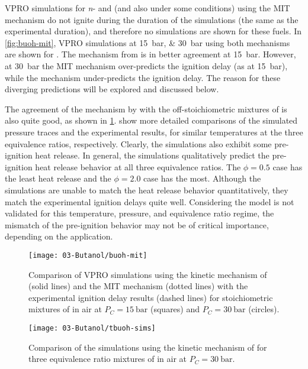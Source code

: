 \documentclass[../main.tex]{subfiles}
\begin{document}
VPRO simulations for \textit{n}- and \sBuOH{} (and also \tBuOH{} under
some conditions) using the MIT mechanism
\cite{Hansen2013,Merchant2013} do not ignite during the duration of the
simulations (the same as the experimental duration), and therefore no
simulations are shown for these fuels. In \cref{fig:buoh-mit}, VPRO
simulations at \SIlist{15;30}{\bar} using both mechanisms are shown for
\iBuOH{}. The mechanism from \textcite{Sarathy2012}
is in better agreement at \SI{15}{\bar}. However, at \SI{30}{\bar} the MIT mechanism
\cite{Hansen2013,Merchant2013} over-predicts the ignition delay (as at \SI{15}{\bar}),
while the \textcite{Sarathy2012} mechanism under-predicts the ignition delay.
The reason for these diverging predictions will be explored and discussed below.

The agreement of the mechanism by \textcite{Sarathy2012} with the
off-stoichiometric mixtures of \tBuOH{} is also quite good, as shown
in \cref{fig:tbuoh-sims}.  show more detailed comparisons
of the simulated pressure traces and the experimental results, for similar
temperatures at the three equivalence ratios, respectively. Clearly, the
simulations also exhibit some pre-ignition heat release. In general, the
simulations qualitatively predict the pre-ignition heat release behavior at all
three equivalence ratios. The $\phi=\num{0.5}$ case has the least heat release and
the $\phi=\num{2.0}$ case has the most. Although the simulations are unable to match
the heat release behavior quantitatively, they match the experimental ignition
delays quite well. Considering the model is not validated for this temperature,
pressure, and equivalence ratio regime, the mismatch of the pre-ignition
behavior may not be of critical importance, depending on the application.

\begin{figure}
    \begin{floatrow}
        \ffigbox
            {\texttt{[image: 03-Butanol/buoh-mit]}}
            {\caption{Comparison of VPRO simulations using the kinetic mechanism of
                \textcite{Sarathy2012} (solid lines) and the MIT mechanism
                \cite{Hansen2013,Merchant2013} (dotted lines) with the experimental
                ignition delay results (dashed lines) for stoichiometric mixtures of
                \iBuOH{} in air at $P_C=\SI{15}{\bar}$ (squares) and $P_C=\SI{30}{\bar}$
                (circles).}
            \label{fig:buoh-mit}}
        \ffigbox
            {\texttt{[image: 03-Butanol/tbuoh-sims]}}
            {\caption{Comparison of the simulations using the kinetic mechanism of
                \textcite{Sarathy2012} for three equivalence ratio mixtures of
                \tBuOH{} in air at $P_C=\SI{30}{\bar}$.}
            \label{fig:tbuoh-sims}}
    \end{floatrow}
\end{figure}
\end{document}
